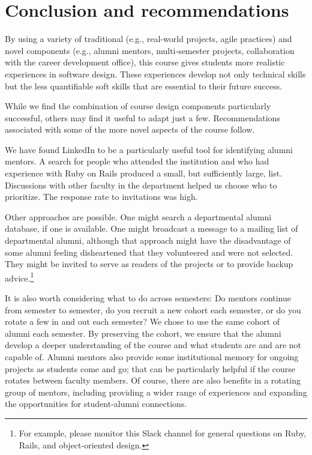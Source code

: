 \section{Conclusion and recommendations}

By using a variety of traditional (e.g., real-world projects, agile
practices) and novel components (e.g., alumni mentors, multi-semester
projects, collaboration with the career development office), this
course gives students more realistic experiences in software design.
These experiences develop not only technical skills but the less
quantifiable soft skills that are essential to their future success.

While we find the combination of course design components particularly
successful, others may find it useful to adapt just a few.  Recommendations
associated with some of the more novel aspects of the course follow.

We have found LinkedIn to be a particularly useful tool for identifying
alumni mentors.  A search for people who attended the institution and
who had experience with Ruby on Rails produced a small, but sufficiently
large, list.  Discussions with other faculty in the department helped
us choose who to prioritize.  The response rate to invitations was high.

Other approaches are possible.  One might search a departmental
alumni database, if one is available.  One might broadcast a message
to a mailing list of departmental alumni, although that approach
might have the disadvantage of some alumni feeling disheartened
that they volunteered and were not selected.  They might be invited
to serve as readers of the projects or to provide backup
advice.\footnote{For example, please monitor this Slack channel for
general questions on Ruby, Rails, and object-oriented design.}

It is also worth considering what to do across semesters: Do mentors
continue from semester to semester, do you recruit a new cohort
each semester, or do you rotate a few in and out each semester?  We
chose to use the same cohort of alumni each semester.  By preserving
the cohort, we ensure that the alumni develop a deeper understanding
of the course and what students are and are not capable of.  Alumni
mentors also provide some institutional memory for ongoing projects
as students come and go; that can be particularly helpful if the course
rotates between faculty members.  Of course, there are also benefits in
a rotating group of mentors, including providing a wider range of
experiences and expanding the opportunities for student-alumni
connections.

